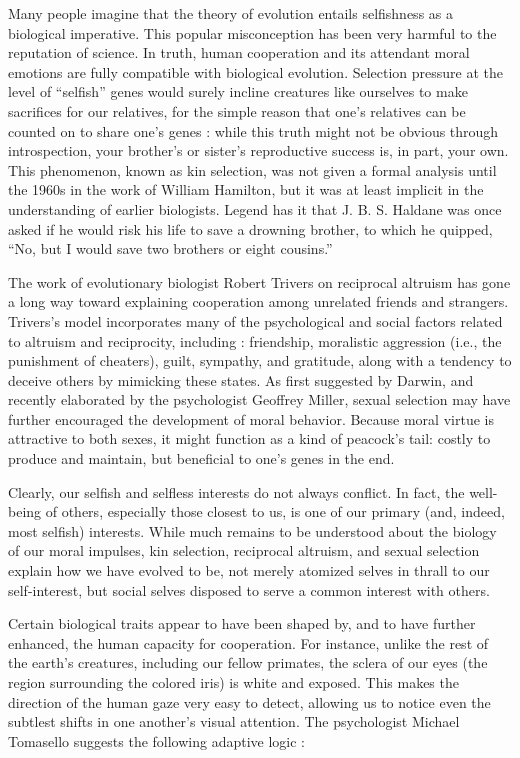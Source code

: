 \documentclass[a4paper,14pt]{extbook}
\begin{document}
Many people imagine that the theory of evolution entails selfishness as a biological imperative.
This popular misconception has been very harmful to the reputation of science.
In truth, human cooperation and its attendant moral emotions are fully compatible with biological evolution.
Selection pressure at the level of ``selfish'' genes would surely incline creatures like ourselves to make sacrifices for our relatives, for the simple reason that one's relatives can be counted on to share one's genes :
while this truth might not be obvious through introspection, your brother's or sister's reproductive success is, in part, your own.
This phenomenon, known as kin selection, was not given a formal analysis until the 1960s in the work of William Hamilton, but it was at least implicit in the understanding of earlier biologists.
Legend has it that J. B. S. Haldane was once asked if he would risk his life to save a drowning brother, to which he quipped, ``No, but I would save two brothers or eight cousins.''

The work of evolutionary biologist Robert Trivers on reciprocal altruism has gone a long way toward explaining cooperation among unrelated friends and strangers.
Trivers's model incorporates many of the psychological and social factors related to altruism and reciprocity, including :
friendship, moralistic aggression (i.e., the punishment of cheaters), guilt, sympathy, and gratitude, along with a tendency to deceive others by mimicking these states.
As first suggested by Darwin, and recently elaborated by the psychologist Geoffrey Miller, sexual selection may have further encouraged the development of moral behavior.
Because moral virtue is attractive to both sexes, it might function as a kind of peacock's tail:
costly to produce and maintain, but beneficial to one's genes in the end.

Clearly, our selfish and selfless interests do not always conflict.
In fact, the well-being of others, especially those closest to us, is one of our primary (and, indeed, most selfish) interests.
While much remains to be understood about the biology of our moral impulses, kin selection, reciprocal altruism, and sexual selection explain how we have evolved to be, not merely atomized selves in thrall to our self-interest, but social selves disposed to serve a common interest with others.

Certain biological traits appear to have been shaped by, and to have further enhanced, the human capacity for cooperation.
For instance, unlike the rest of the earth's creatures, including our fellow primates, the sclera of our eyes (the region surrounding the colored iris) is white and exposed.
This makes the direction of the human gaze very easy to detect, allowing us to notice even the subtlest shifts in one another's visual attention.
The psychologist Michael Tomasello suggests the following adaptive logic :
\end{document}

